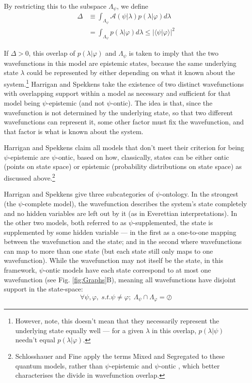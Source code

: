 \documentclass[superscriptaddress, floatfix,nofootinbib,12pt]{revtex4-2}
\newcommand{\braket}[2]{\langle #1|#2 \rangle}
\begin{document}
By restricting this to the subspace $\Lambda_\psi$, we define
\begin{equation}
\begin{split}
\Delta&\equiv\int_{\Lambda_\psi}\mathcal{A}(\psi\vert\lambda) p(\lambda\vert\varphi) d\lambda\\
    &=\int_{\Lambda_\psi} p(\lambda\vert\varphi) d\lambda\leq\vert\braket{\psi}{\varphi}\vert^2
    \end{split}
\end{equation}

If $\Delta>0$, this overlap of $p(\lambda\vert\varphi)$ and $\Lambda_\psi$ is taken to imply that the two wavefunctions in this model are epistemic states, because the same underlying state $\lambda$ could be represented by either depending on what it known about the system.\footnote{However, note, this doesn't mean that they necessarily represent the underlying state equally well --- for a given $\lambda$ in this overlap, $p(\lambda\vert\psi)$ needn't equal $p(\lambda\vert\varphi)$.} Harrigan and Spekkens take the existence of two distinct wavefunctions with overlapping support within a model as necessary and sufficient for that model being $\psi$-epistemic (and not $\psi$-ontic). The idea is that, since the wavefunction is not determined by the underlying state, so that two different wavefunctions can represent it, some other factor must fix the wavefunction, and that factor is what is known about the system.

Harrigan and Spekkens claim all models that don't meet their criterion for being $\psi$-epistemic are $\psi$-ontic, based on how, classically, states can be either ontic (points on state space) or epistemic (probability distributions on state space) as discussed above.\footnote{Schlosshauer and Fine apply the terms Mixed and Segregated to these quantum models, rather than $\psi$-epistemic and $\psi$-ontic \cite{Schlosshauer2012Implications}, which better characterises the divide in wavefunction overlap.}

Harrigan and Spekkens give three subcategories of $\psi$-ontology. In the strongest (the $\psi$-complete model), the wavefunction describes the system's state completely and no hidden variables are left out by it (as in Everettian interpretations). In the other two models, both referred to as $\psi$-supplemented, the state is supplemented by some hidden variable --- in the first as a one-to-one mapping between the wavefunction and the state; and in the second where wavefunctions can map to more than one state (but each state still only maps to one wavefunction). While the wavefunction may not itself be the state, in this framework, $\psi$-ontic models have each state correspond to at most one wavefunction (see Fig. \ref{fig:Graphs}B), meaning all wavefunctions have disjoint support in the state-space:
\begin{equation}
    \forall\psi,\varphi,\;s.t.\psi\neq\varphi;\;\Lambda_{\psi}\cap\Lambda_{\varphi}=\oslash
\end{equation}
\end{document}
